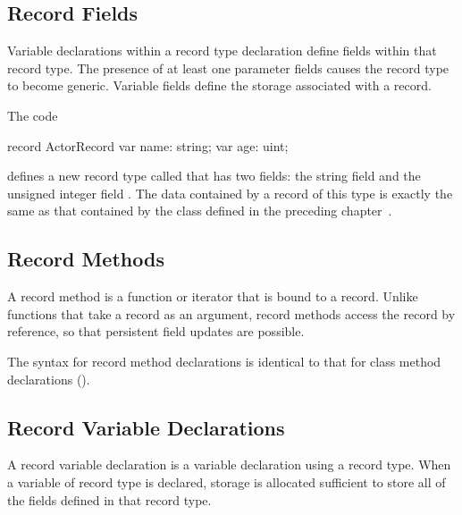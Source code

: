 \subsection{Record Fields}
\label{Record_Fields}

Variable declarations within a record type declaration define fields within that
record type.  The presence of at least one parameter fields causes the record
type to become generic.  Variable fields define the storage associated with a
record.

\begin{example}
The code
\begin{chapelpre}
\end{chapelpre}
\begin{chapel}
record ActorRecord {
  var name: string;
  var age: uint;
}
\end{chapel}
\begin{chapeloutput}
\end{chapeloutput}
defines a new record type called  that has two fields: the
string field  and the unsigned integer field .  The data
contained by a record of this type is exactly the same as that contained by
the  class defined in the preceding chapter~.
\end{example}

\subsection{Record Methods}
\label{Record_Methods}

A record method is a function or iterator that is bound to a record.  Unlike
functions that take a record as an argument, record methods access the record by
reference, so that persistent field updates are possible.

The syntax for record method declarations is identical to that for class method
declarations ().

\subsection{Record Variable Declarations}
\label{Record_Variable_Declarations}

A record variable declaration is a variable declaration using a record type.
When a variable of record type is declared, storage is allocated sufficient to
store all of the fields defined in that record type.  

